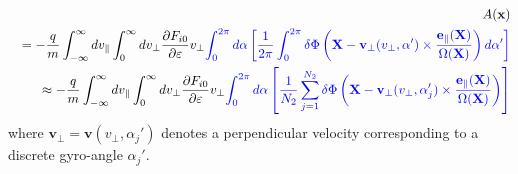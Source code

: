 \documentclass{article}
\newcommand{\tmcolor}[2]{{\color{#1}{#2}}}
\begin{document}
\begin{eqnarray*}
  &  & A (\mathbf{x})\\
  &  & = - \frac{q}{m} \int_{- \infty}^{\infty} d v_{\parallel}
  \int_0^{\infty} d v_{\perp} \frac{\partial F_{i 0}}{\partial \varepsilon}
  v_{\perp} \tmcolor{blue}{\int_0^{2 \pi} d \alpha \left[ \frac{1}{2 \pi}
  \int_0^{2 \pi} \delta \Phi \left( \mathbf{X}-\mathbf{v}_{\perp} (v_{\perp},
  \alpha') \times \frac{\mathbf{e}_{\parallel} (\mathbf{X})}{\Omega
  (\mathbf{X})} \right) d \alpha' \right]}\\
  &  & \approx - \frac{q}{m} \int_{- \infty}^{\infty} d v_{\parallel}
  \int_0^{\infty} d v_{\perp} \frac{\partial F_{i 0}}{\partial \varepsilon}
  v_{\perp} \tmcolor{blue}{\int_0^{2 \pi} d \alpha \left[ \frac{1}{N_2}
  \sum_{j = 1}^{N_2} \delta \Phi \left( \mathbf{X}-\mathbf{v}_{\perp}
  (v_{\perp}, \alpha'_j) \times \frac{\mathbf{e}_{\parallel}
  (\mathbf{X})}{\Omega (\mathbf{X})} \right) \right]}
\end{eqnarray*}
where $\mathbf{v}_{\perp} = \mathbf{v} (v_{\perp}, \alpha_j')$ denotes a
perpendicular velocity corresponding to a discrete gyro-angle $\alpha_j'$.
\end{document}
